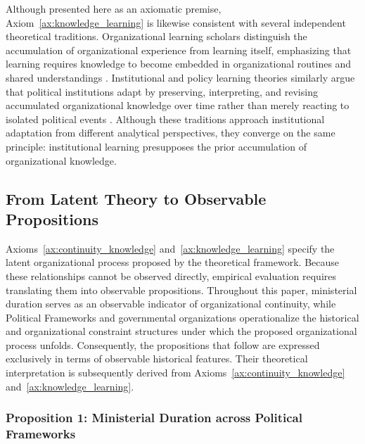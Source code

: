 \documentclass[doc, 12pt, a4paper,floatsintext]{apa7}
\begin{document}
Although presented here as an axiomatic premise, Axiom~\ref{ax:knowledge_learning} is likewise consistent with several independent theoretical traditions. Organizational learning scholars distinguish the accumulation of organizational experience from learning itself, emphasizing that learning requires knowledge to become embedded in organizational routines and shared understandings \parencite{fiol_organizational_1985}. Institutional and policy learning theories similarly argue that political institutions adapt by preserving, interpreting, and revising accumulated organizational knowledge over time rather than merely reacting to isolated political events \parencite{olsen_governing_2010,hall_policy_1993}. Although these traditions approach institutional adaptation from different analytical perspectives, they converge on the same principle: institutional learning presupposes the prior accumulation of organizational knowledge.
%

%
%
\subsection{From Latent Theory to Observable Propositions}

Axioms~\ref{ax:continuity_knowledge} and~\ref{ax:knowledge_learning} specify the latent organizational process proposed by the theoretical framework. Because these relationships cannot be observed directly, empirical evaluation requires translating them into observable propositions. Throughout this paper, ministerial duration serves as an observable indicator of organizational continuity, while Political Frameworks and governmental organizations operationalize the historical and organizational constraint structures under which the proposed organizational process unfolds. Consequently, the propositions that follow are expressed exclusively in terms of observable historical features. Their theoretical interpretation is subsequently derived from Axioms~\ref{ax:continuity_knowledge} and~\ref{ax:knowledge_learning}.

\subsubsection{Proposition 1: Ministerial Duration across Political Frameworks}
\end{document}
